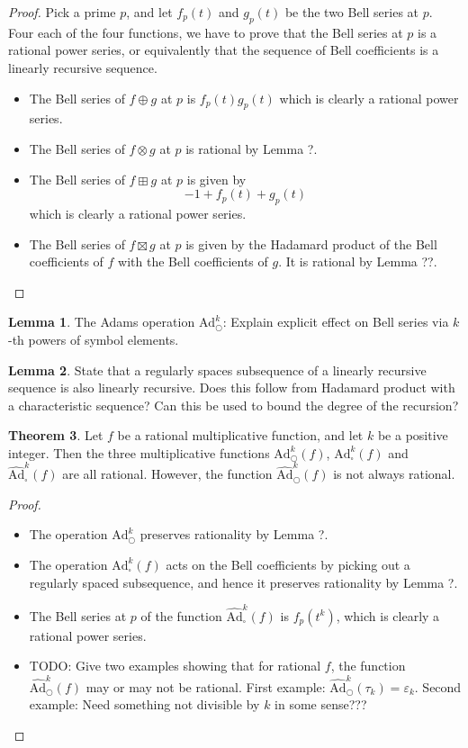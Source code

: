 \documentclass[a4paper]{article}
\theoremstyle{definition}
\newtheorem{theorem}{Theorem}[section]
\newtheorem{lemma}[theorem]{Lemma}
\theoremstyle{remark}
\newcommand{\adam}[1]{\text{Ad}^{#1}_{\bigcirc}}
\newcommand{\hatadam}[1]{\widehat{\text{Ad}}^{#1}_{\bigcirc}}
\newcommand{\boxadam}[1]{\text{Ad}^{#1}_{\square}}
\newcommand{\hatboxadam}[1]{\widehat{\text{Ad}}^{#1}_{\square}}
\begin{document}
\begin{proof}
Pick a prime $p$, and let $f_p(t)$ and $g_p(t)$ be the two Bell series at $p$. Four each of the four functions, we have to prove that the Bell series at $p$ is a rational power series, or equivalently that the sequence of Bell coefficients is a linearly recursive sequence.
\begin{itemize}
\item The Bell series of $f \oplus g$ at $p$ is $f_p(t) g_p(t)$ which is clearly a rational power series.
\item The Bell series of $f \otimes g$ at $p$ is rational by Lemma ?.
\item The Bell series of $f \boxplus g$ at $p$ is given by 
$$  -1 + f_p(t) + g_p(t)    $$
which is clearly a rational power series.
\item The Bell series of $f \boxtimes g$ at $p$ is given by the Hadamard product of the Bell coefficients of $f$ with the Bell coefficients of $g$. It is rational by Lemma ??.
\end{itemize}
\end{proof}

\begin{lemma}
The Adams operation $\adam{k}$: Explain explicit effect on Bell series via $k$-th powers of symbol elements.
\end{lemma}

\begin{lemma}
State that a regularly spaces subsequence of a linearly recursive sequence is also linearly recursive. Does this follow from Hadamard product with a characteristic sequence? Can this be used to bound the degree of the recursion?
\end{lemma}

\begin{theorem}
Let $f$ be a rational multiplicative function, and let $k$ be a positive integer. Then the three multiplicative functions $\adam{k}(f)$, $\boxadam{k}(f)$ and $\hatboxadam{k}(f)$ are all rational. However, the function $\hatadam{k}(f)$ is not always rational.
\end{theorem}

\begin{proof}
\begin{itemize}
\item The operation $\adam{k}$ preserves rationality by Lemma ?.
\item The operation $\boxadam{k}(f)$ acts on the Bell coefficients by picking out a regularly spaced subsequence, and hence it preserves rationality by Lemma ?. 
\item The Bell series at $p$ of the function $\hatboxadam{k}(f)$ is $f_p(t^k)$, which is clearly a rational power series. 
\item TODO: Give two examples showing that for rational $f$, the function $\hatadam{k}(f)$ may or may not be rational. First example: $\hatadam{k}(\tau_k) = \varepsilon_k$. Second example: Need something not divisible by $k$ in some sense???
\end{itemize}
\end{proof}
\end{document}
